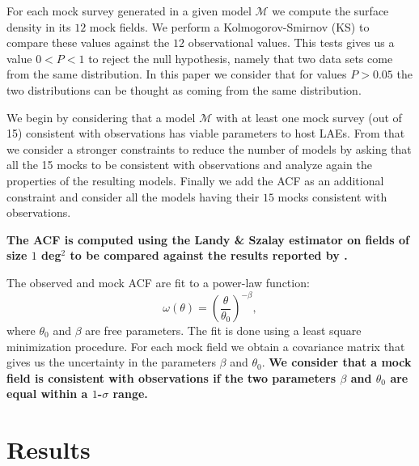 \documentclass[usenatbib]{mn2e}
\begin{document}
For each mock survey generated in a given model ${\mathcal M}$ we
compute the surface density in its $12$ mock fields. We perform a
Kolmogorov-Smirnov (KS) to compare these values against the $12$
observational values. This tests gives us a value $0<P<1$ to
reject the null hypothesis, namely that two data sets come from the
same distribution. In this paper we consider that for values $P>0.05$
the two distributions can be thought as coming from the same
distribution.

We begin by considering that  a model ${\mathcal M}$ with at least one
mock survey (out of 15) consistent with observations has viable
parameters to host LAEs. From that we consider a stronger constraints
to reduce the number of models by asking that all the 15 mocks to be
consistent with observations and analyze again the properties of the
resulting models. Finally we add the ACF as an additional constraint
and consider all the models having their $15$ mocks consistent with
observations. 

{\bf The ACF is computed using  the Landy \&  Szalay estimator
  \citep{Landy1993}  on fields of size $1$ deg$^2$ to be compared
  against the results reported by \cite{Ouchi2010}.}

The observed and mock ACF are fit to a power-law function:
\begin{equation}
\omega(\theta) = \left(\frac{\theta}{\theta_{0}}\right)^{-\beta}, 
\label{eq:fitting}
\end{equation}
where $\theta_0$ and $\beta$ are free parameters. The fit is done
using a least square minimization procedure. For each mock field we
obtain a covariance matrix that gives us the uncertainty in the
parameters $\beta$ and $\theta_0$. {\bf We consider that a mock field is
consistent with observations if the two parameters $\beta$ and
$\theta_0$ are equal within a $1$-$\sigma$ range.}
 
\section{Results}
\label{sec:results}
\end{document}
